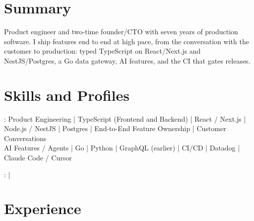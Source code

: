 \documentclass[print]{jack-resume}
\begin{document}
\pagecolor{darkmodeBackground}


\begin{minipage}[t][1cm][t]{.03\textwidth}
    \hfill
\end{minipage}

\section{Summary}
Product engineer and two-time founder/CTO with seven years of production software. I ship features end to end at high pace, from the conversation with the customer to production: typed TypeScript on React/Next.js and NestJS/Postgres, a Go data gateway, AI features, and the CI that gates releases.
\sectionsep

\section{Skills and Profiles}
:
Product Engineering \hfill | \hfill
TypeScript (Frontend and Backend) \hfill | \hfill
React / Next.js \hfill | \hfill
Node.js / NestJS \hfill | \hfill
Postgres \hfill | \hfill
End-to-End Feature Ownership \hfill | \hfill
Customer Conversations \\
\hspace{1.0cm} AI Features / Agents \hfill | \hfill
Go \hfill | \hfill
Python \hfill | \hfill
GraphQL (earlier) \hfill | \hfill
CI/CD \hfill | \hfill
Datadog \hfill | \hfill
Claude Code / Cursor \\

\raggedright{
    :
      \href{https://www.linkedin.com/in/jack-sturtevant/}{ \ExternalLink} |
     \href{https://github.com/jacksturt}{ \ExternalLink}}

\section{Experience}
\end{document}
